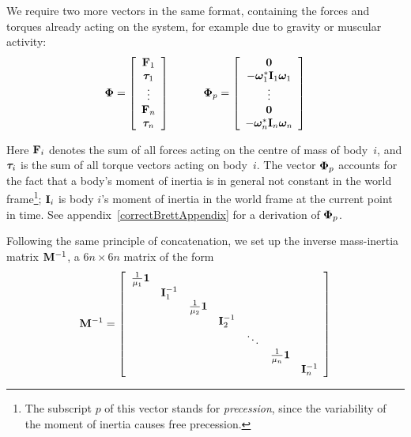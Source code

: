 We require two more vectors in the same format, containing the forces and torques already acting
on the system, for example due to gravity or muscular activity:
\begin{equation} \label{PhiVector}
\ve{\Phi} = \left[\begin{array}{c}
    \ve{F}_1 \\ \ve{\tau}_1 \\ \vdots \\ \ve{F}_n \\ \ve{\tau}_n
    \end{array}\right]
    \quad\quad\quad
\ve{\Phi}_p = \left[\begin{array}{c}
    \ve{0} \\ -\dual{\ve{\omega}_1}\m{I}_1\ve{\omega}_1 \\ \vdots \\
    \ve{0} \\ -\dual{\ve{\omega}_n}\m{I}_n\ve{\omega}_n
    \end{array}\right]
\end{equation}

Here $\ve{F}_i$ denotes the sum of all forces acting on the centre of mass of body~$i$, and
$\ve{\tau}_i$ is the sum of all torque vectors acting on body~$i$. The vector $\ve{\Phi}_p$
accounts for the fact that a body's moment of inertia is in general not constant in the world
frame\footnote{The subscript $p$ of this vector stands for \emph{precession}, since the
variability of the moment of inertia causes free precession.}; $\m{I}_i$ is body $i$'s moment
of inertia in the world frame at the current point in time.
See appendix~\ref{correctBrettAppendix} for a derivation of $\ve{\Phi}_p$.

Following the same principle of concatenation, we set up the inverse mass-inertia matrix
$\m{M}^{-1}$, a $6n\times6n$ matrix of the form
\begin{equation}
\label{massInertiaTensor}
\m{M}^{-1} = \left[ \begin{array}{ccccccc}
    \frac{1}{\mu_1}\m{1} \\ & \m{I}_1^{-1} \\ &&
    \frac{1}{\mu_2}\m{1} \\ &&& \m{I}_2^{-1} \\ &&&& \ddots \\ &&&&&
    \frac{1}{\mu_n}\m{1} \\ &&&&&& \m{I}_n^{-1}
    \end{array}\right]
\end{equation}

